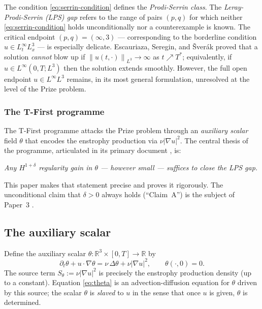 \documentclass[12pt]{article}
\theoremstyle{plain}
\theoremstyle{definition}
\theoremstyle{remark}
\newcommand{\R}{\mathbb{R}}
\newcommand{\norm}[1]{\left\|#1\right\|}
\newcommand{\abs}[1]{\left|#1\right|}
\newcommand{\pa}{\partial}
\newcommand{\grad}{\nabla}
\newcommand{\lap}{\Delta}
\begin{document}
The condition \eqref{eq:serrin-condition} defines the \emph{Prodi-Serrin class}.
The \emph{Leray-Prodi-Serrin (LPS) gap} refers to the range of pairs $(p,q)$ for
which neither \eqref{eq:serrin-condition} holds unconditionally nor a counterexample
is known.
The critical endpoint $(p,q)=(\infty,3)$ — corresponding to the borderline condition
$u\in L^\infty_t L^3_x$ — is especially delicate.
Escauriaza, Seregin, and \v{S}ver\'ak \cite{ESS2003} proved that a solution
\emph{cannot} blow up if $\norm{u(t,\cdot)}_{L^3}\to\infty$ as $t\nearrow T^*$;
equivalently, if $u\in L^\infty(0,T;L^3)$ then the solution extends smoothly.
However, the full open endpoint $u\in L^\infty L^3$ remains, in its most general
formulation, unresolved at the level of the Prize problem.

\subsubsection*{The T-First programme}

The T-First programme attacks the Prize problem through an \emph{auxiliary scalar}
field $\theta$ that encodes the enstrophy production via
$\nu\abs{\grad u}^2$.
The central thesis of the programme, articulated in its primary document
\cite{TFirstPRD2026}, is:

\begin{center}
  \emph{Any $H^{1+\delta}$ regularity gain in $\theta$ — however small — suffices
  to close the LPS gap.}
\end{center}

This paper makes that statement precise and proves it rigorously.
The unconditional claim that $\delta>0$ always holds (``Claim~A'') is the subject
of Paper~3 \cite{TFirstPaper3}.

\subsection{The auxiliary scalar}

Define the auxiliary scalar $\theta:\R^3\times[0,T]\to\R$ by
\begin{equation}\label{eq:theta}
  \pa_t\theta + u\cdot\grad\theta = \nu\,\lap\theta + \nu\abs{\grad u}^2,
  \qquad \theta(\cdot,0) = 0.
\end{equation}
The source term $S_\theta := \nu\abs{\grad u}^2$ is precisely the enstrophy
production density (up to a constant).
Equation \eqref{eq:theta} is an advection-diffusion equation for $\theta$ driven
by this source; the scalar $\theta$ is \emph{slaved} to $u$ in the sense that once
$u$ is given, $\theta$ is determined.
\end{document}
